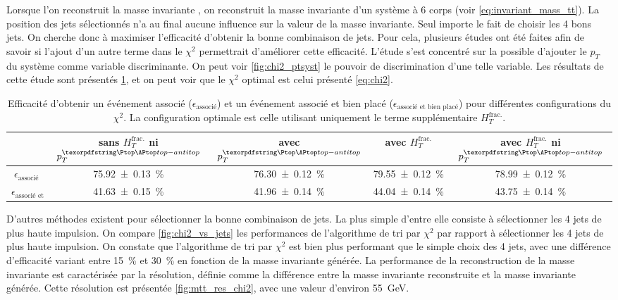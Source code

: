 Lorsque l'on reconstruit la masse invariante \ttbar, on reconstruit la masse invariante d'un système à 6 corps (voir \cref{eq:invariant_mass_tt}). La position des jets sélectionnés n'a au final aucune influence sur la valeur de la masse invariante. Seul importe le fait de choisir les 4 bons jets. On cherche donc à maximiser l'efficacité d'obtenir la bonne combinaison de jets. Pour cela, plusieurs études ont été faites afin de savoir si l'ajout d'un autre terme dans le $\chi^2$ permettrait d'améliorer cette efficacité. L'étude s'est concentré sur la possible d'ajouter le $p_T$ du système \ttbar comme variable discriminante. On peut voir \cref{fig:chi2_ptsyst} le pouvoir de discrimination d'une telle variable. Les résultats de cette étude sont présentés \cref{tab:chi2_study}, et on peut voir que le $\chi^2$ optimal est celui présenté \cref{eq:chi2}.

\begin{table}[h] \centering
    \begin{tabular}{@{}ccccc@{}} \toprule
        & sans $H_{T}^{\text{frac.}}$ ni $p_{T}^{\ttbar}$ & avec $p_{T}^{\ttbar}$ & avec $H_{T}^{\text{frac.}}$ & avec $H_{T}^{\text{frac.}}$ ni $p_{T}^{\ttbar}$ \\ \midrule
        $\epsilon_\text{associé}$ & \SI{75.92 \pm 0.13}{\%} & \SI{76.30 \pm 0.12}{\%} & \SI{79.55 \pm 0.12}{\%} & \SI{78.99 \pm 0.12}{\%} \\
        $\epsilon_\text{associé et bien placé}$ & \SI{41.63 \pm 0.15}{\%} & \SI{41.96 \pm 0.14}{\%} & \SI{44.04 \pm 0.14}{\%} & \SI{43.75 \pm 0.14}{\%} \\ \bottomrule
    \end{tabular}
    \caption{Efficacité d'obtenir un événement associé ($\epsilon_\text{associé}$) et un événement associé et bien placé ($\epsilon_\text{associé et bien placé}$) pour différentes configurations du $\chi^2$. La configuration optimale est celle utilisant uniquement le terme supplémentaire $H_{T}^{\text{frac.}}$.}
    \label{tab:chi2_study}
\end{table}

D'autres méthodes existent pour sélectionner la bonne combinaison de jets. La plus simple d'entre elle consiste à sélectionner les 4 jets de plus haute impulsion. On compare \cref{fig:chi2_vs_jets} les performances de l'algorithme de tri par $\chi^2$ par rapport à sélectionner les 4 jets de plus haute impulsion. On constate que l'algorithme de tri par $\chi^2$ est bien plus performant que le simple choix des 4 jets, avec une différence d'efficacité variant entre \tilde\SI{15}{\%} et \tilde\SI{30}{\%} en fonction de la masse invariante \ttbar générée. La performance de la reconstruction de la masse invariante est caractérisée par la résolution, définie comme la différence entre la masse invariante reconstruite et la masse invariante générée. Cette résolution est présentée \cref{fig:mtt_res_chi2}, avec une valeur d'environ \SI{55}{\GeV}.

